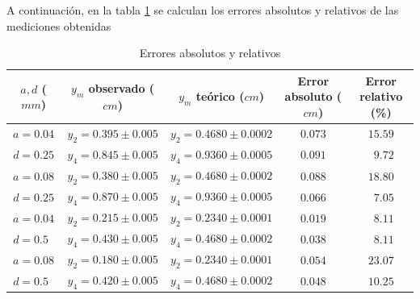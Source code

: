 \documentclass[12pt,a4paper]{article}
\begin{document}
 	A continuación, en la tabla \ref{tab:errores} se calculan los errores absolutos y relativos de las mediciones obtenidas
 	\begin{table}[!htb]
 		\centering
 		\caption{Errores absolutos y relativos}
 		\begin{tabular}{|c|c|c|c|c|}
 			\hline
			$ a, d $ (\(mm\)) & $ y_m $ observado (\(cm\)) & $ y_m $ teórico (\(cm\)) & Error absoluto (\(cm\)) & Error relativo (\textsc{\%})  \\
 			\hline
 			$ a=0.04 $          & $y_2=0.395\pm 0.005 $ & $y_2=0.4680\pm0.0002 $ & $ 0.073 $ & $ 15.59 $ \\ \cline{2-5}
 			$ d=0.25 $          & $y_4=0.845\pm 0.005 $ & $y_4=0.9360\pm0.0005 $ & $ 0.091 $ & $ \phantom{0}9.72 $ \\ \hline
 			$ a=0.08 $          & $y_2=0.380\pm 0.005 $ & $y_2=0.4680\pm0.0002 $ & $ 0.088 $ & $ 18.80 $ \\ \cline{2-5}
 			$ d=0.25 $          & $y_4=0.870\pm 0.005 $ & $y_4=0.9360\pm0.0005 $ & $ 0.066 $ & $ \phantom{0}7.05 $ \\ \hline
 			$ a=0.04 $          & $y_2=0.215\pm 0.005 $ & $y_2=0.2340\pm0.0001 $ & $ 0.019 $ & $ \phantom{0}8.11 $ \\ \cline{2-5}
 			$ d=0.5\phantom{0} $& $y_4=0.430\pm 0.005 $ & $y_4=0.4680\pm0.0002 $ & $ 0.038 $ & $ \phantom{0}8.11 $ \\ \hline
 			$ a=0.08 $          & $y_2=0.180\pm 0.005 $ & $y_2=0.2340\pm0.0001 $ & $ 0.054 $ & $ 23.07 $ \\ \cline{2-5}
 			$ d=0.5\phantom{0} $& $y_4=0.420\pm 0.005 $ & $y_4=0.4680\pm0.0002 $ & $ 0.048 $ & $ 10.25 $ \\ \hline
 		\end{tabular} 
 		\label{tab:errores}
 	\end{table}
	\newpage
\end{document}
